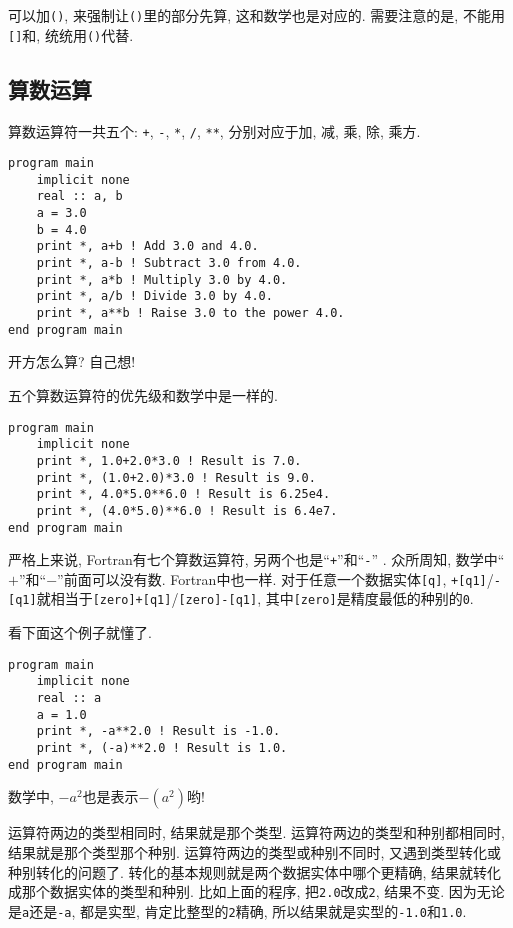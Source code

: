 可以加\texttt{()}, 来强制让\texttt{()}里的部分先算, 这和数学也是对应的. 需要注意的是, 不能用\texttt{[]}和\texttt{{}}, 统统用\texttt{()}代替.

\subsection{算数运算}\label{fortran_numeric_operator}

算数运算符一共五个: \texttt{+}, \texttt{-}, \texttt{*}, \texttt{/}, \texttt{**}, 分别对应于加, 减, 乘, 除, 乘方.
\begin{lstlisting}
program main
    implicit none
    real :: a, b
    a = 3.0
    b = 4.0
    print *, a+b ! Add 3.0 and 4.0.
    print *, a-b ! Subtract 3.0 from 4.0.
    print *, a*b ! Multiply 3.0 by 4.0.
    print *, a/b ! Divide 3.0 by 4.0.
    print *, a**b ! Raise 3.0 to the power 4.0.
end program main
\end{lstlisting}

开方怎么算? 自己想!

五个算数运算符的优先级和数学中是一样的.
\begin{lstlisting}
program main
    implicit none
    print *, 1.0+2.0*3.0 ! Result is 7.0.
    print *, (1.0+2.0)*3.0 ! Result is 9.0.
    print *, 4.0*5.0**6.0 ! Result is 6.25e4.
    print *, (4.0*5.0)**6.0 ! Result is 6.4e7.
end program main
\end{lstlisting}

严格上来说, Fortran有七个算数运算符, 另两个也是``\texttt{+}''和``\texttt{-}'' . 众所周知, 数学中``$+$''和``$-$''前面可以没有数. Fortran中也一样. 对于任意一个数据实体\texttt{[q]}, \texttt{+[q1]}/\texttt{-[q1]}就相当于\texttt{[zero]+[q1]}/\texttt{[zero]-[q1]}, 其中\texttt{[zero]}是精度最低的种别的\texttt{0}.

看下面这个例子就懂了.
\begin{lstlisting}
program main
    implicit none
    real :: a
    a = 1.0
    print *, -a**2.0 ! Result is -1.0.
    print *, (-a)**2.0 ! Result is 1.0.
end program main
\end{lstlisting}

数学中, $-a^2$也是表示$-(a^2)$哟!

运算符两边的类型相同时, 结果就是那个类型. 运算符两边的类型和种别都相同时, 结果就是那个类型那个种别. 运算符两边的类型或种别不同时, 又遇到类型转化或种别转化的问题了. 转化的基本规则就是两个数据实体中哪个更精确, 结果就转化成那个数据实体的类型和种别. 比如上面的程序, 把\texttt{2.0}改成\texttt{2}, 结果不变. 因为无论是\texttt{a}还是\texttt{-a}, 都是实型, 肯定比整型的\texttt{2}精确, 所以结果就是实型的\texttt{-1.0}和\texttt{1.0}.

